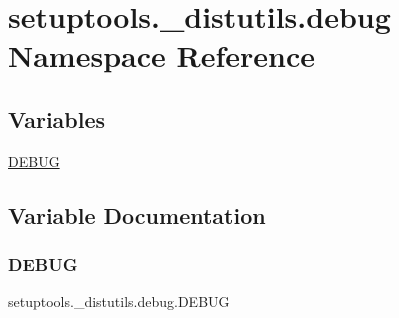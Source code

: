 \hypertarget{namespacesetuptools_1_1__distutils_1_1debug}{}\section{setuptools.\+\_\+distutils.\+debug Namespace Reference}
\label{namespacesetuptools_1_1__distutils_1_1debug}
\subsection*{Variables}
\begin{DoxyCompactItemize}
\item 
\hyperlink{namespacesetuptools_1_1__distutils_1_1debug_a491496017641485df4fe056d97dddc3e}{D\+E\+B\+UG}
\end{DoxyCompactItemize}


\subsection{Variable Documentation}
\mbox{\label{namespacesetuptools_1_1__distutils_1_1debug_a491496017641485df4fe056d97dddc3e}} 
\subsubsection{\texorpdfstring{D\+E\+B\+UG}{DEBUG}}
{\footnotesize\ttfamily setuptools.\+\_\+distutils.\+debug.\+D\+E\+B\+UG}

